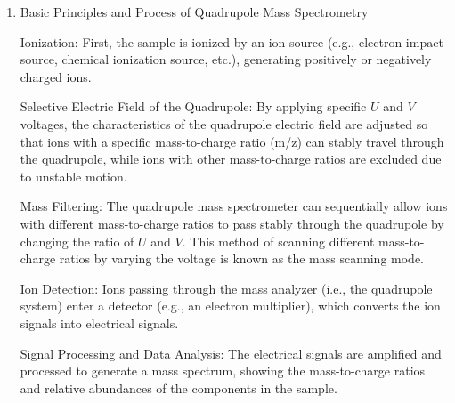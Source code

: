 \begin{enumerate}
	\[
	m\frac{d^2x}{dt^2} = qE_x = -\frac{2q(U + V \cos(\omega t))x}{r_0^2}
	\]
	\[
	m\frac{d^2y}{dt^2} = qE_y = \frac{2q(U + V \cos(\omega t))y}{r_0^2}
	\]
	
	By appropriate variable substitution, the above equations can be simplified to the standard form of the Mathieu equation:
	
	\[
	\frac{d^2u}{d\xi^2} + (a - 2q \cos(2\xi)) u = 0
	\]
	
	where \( u \) can represent either \( x \) or \( y \); \( \xi = \frac{\omega t}{2} \) is the normalized time; \( a_x = \frac{4qU}{m r_0^2 \omega^2} \) and \( q_x = \frac{2qV}{m r_0^2 \omega^2} \) are dimensionless parameters.
	
	The solutions to the Mathieu equation can be classified into two categories: stable solutions and unstable solutions. Stable solutions correspond to the stable motion of ions in the quadrupole electric field, while unstable solutions correspond to the divergence or ejection of ions from the quadrupole system. By analyzing the solutions of the Mathieu equation, one can determine the regions of stable ion motion under specific parameters \( a \) and \( q \), which correspond to ions with equivalent mass-to-charge ratios \( m/z \) that can be stably transmitted through the quadrupole system. Ions in unstable regions will be expelled from the quadrupole due to the alternating electric field and will not reach the detector.
	
	\item Basic Principles and Process of Quadrupole Mass Spectrometry
	
	Ionization: First, the sample is ionized by an ion source (e.g., electron impact source, chemical ionization source, etc.), generating positively or negatively charged ions.
	
	Selective Electric Field of the Quadrupole: By applying specific \( U \) and \( V \) voltages, the characteristics of the quadrupole electric field are adjusted so that ions with a specific mass-to-charge ratio (m/z) can stably travel through the quadrupole, while ions with other mass-to-charge ratios are excluded due to unstable motion.
	
	Mass Filtering: The quadrupole mass spectrometer can sequentially allow ions with different mass-to-charge ratios to pass stably through the quadrupole by changing the ratio of \( U \) and \( V \). This method of scanning different mass-to-charge ratios by varying the voltage is known as the mass scanning mode.
	
	Ion Detection: Ions passing through the mass analyzer (i.e., the quadrupole system) enter a detector (e.g., an electron multiplier), which converts the ion signals into electrical signals.
	
	Signal Processing and Data Analysis: The electrical signals are amplified and processed to generate a mass spectrum, showing the mass-to-charge ratios and relative abundances of the components in the sample.
\end{enumerate}

